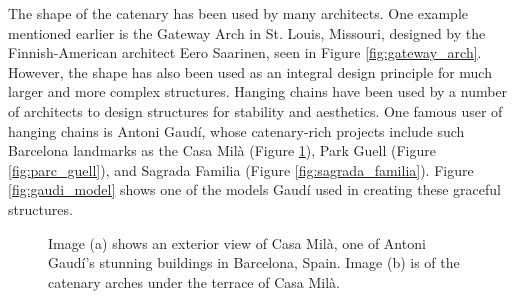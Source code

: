 \documentclass{thesis}
\begin{document}
The shape of the catenary has been used by many architects.  One example mentioned earlier is the Gateway Arch in St. Louis, Missouri, designed by
the Finnish-American architect Eero Saarinen, seen in Figure \ref{fig:gateway_arch}.  However, the shape has also been used as an integral design
principle for much larger and more complex structures.  Hanging chains have been used by a number of architects to design structures for stability and
aesthetics.  One famous user of hanging chains is Antoni Gaud\'{i}, whose catenary-rich projects include such Barcelona landmarks as the Casa Mil\`{a}
(Figure \ref{fig:casa_mila}), Park Guell (Figure \ref{fig:parc_guell}), and Sagrada Familia (Figure \ref{fig:sagrada_familia}).  Figure
\ref{fig:gaudi_model} shows one of the models Gaud\'{i} used in creating these graceful structures.

\begin{figure}
\centering
{}
\caption[Casa Mil\`{a}, Barcelona, Spain]{Image (a) shows an exterior view of Casa Mil\`{a}, one of Antoni Gaud\'{i}'s stunning buildings in
Barcelona, Spain.  Image (b) is of the catenary arches under the terrace of Casa Mil\`{a}.\footnotemark}
\label{fig:casa_mila}
\end{figure}
\end{document}
